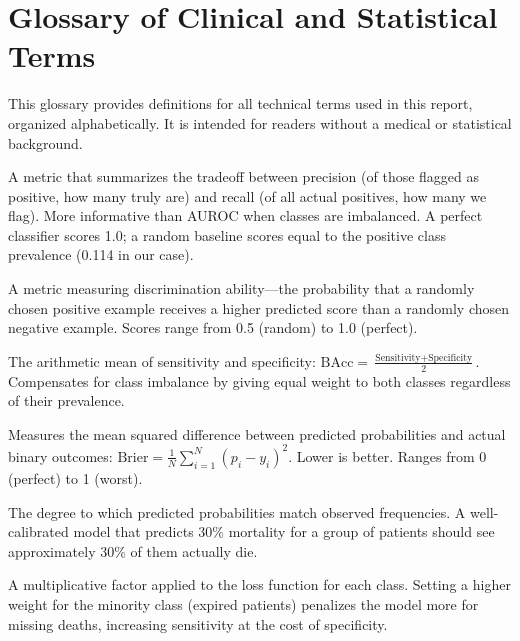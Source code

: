 \documentclass[11pt,a4paper]{report}
\begin{document}
\chapter{Glossary of Clinical and Statistical Terms}

This glossary provides definitions for all technical terms used in this report, organized alphabetically. It is intended for readers without a medical or statistical background.

\begin{description}[leftmargin=2em,style=nextline]

\item[\textbf{AUPRC (Area Under the Precision-Recall Curve)}] A metric that summarizes the tradeoff between precision (of those flagged as positive, how many truly are) and recall (of all actual positives, how many we flag). More informative than AUROC when classes are imbalanced. A perfect classifier scores 1.0; a random baseline scores equal to the positive class prevalence (0.114 in our case).

\item[\textbf{AUROC (Area Under the Receiver Operating Characteristic Curve)}] A metric measuring discrimination ability---the probability that a randomly chosen positive example receives a higher predicted score than a randomly chosen negative example. Scores range from 0.5 (random) to 1.0 (perfect).

\item[\textbf{Balanced Accuracy}] The arithmetic mean of sensitivity and specificity: $\text{BAcc} = \frac{\text{Sensitivity} + \text{Specificity}}{2}$. Compensates for class imbalance by giving equal weight to both classes regardless of their prevalence.

\item[\textbf{Brier Score}] Measures the mean squared difference between predicted probabilities and actual binary outcomes: $\text{Brier} = \frac{1}{N}\sum_{i=1}^{N}(p_i - y_i)^2$. Lower is better. Ranges from 0 (perfect) to 1 (worst).

\item[\textbf{Calibration}] The degree to which predicted probabilities match observed frequencies. A well-calibrated model that predicts 30\% mortality for a group of patients should see approximately 30\% of them actually die.

\item[\textbf{Class Weight}] A multiplicative factor applied to the loss function for each class. Setting a higher weight for the minority class (expired patients) penalizes the model more for missing deaths, increasing sensitivity at the cost of specificity.


\end{description}
\end{document}
